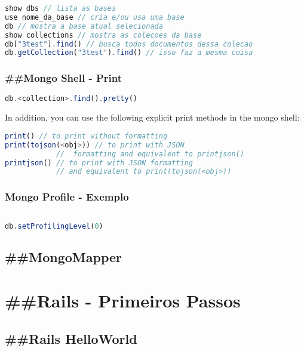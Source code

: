 \documentclass[serif,mathserif]{article}
\begin{document}
\begin{lstlisting}[language=Javascript]
show dbs // lista as bases
use nome_da_base // cria e/ou usa uma base
db // mostra a base atual selecionada
show collections // mostra as colecoes da base
db["3test"].find() // busca todos documentos dessa colecao
db.getCollection("3test").find() // isso faz a mesma coisa
\end{lstlisting}

\subsubsection{\#\#Mongo Shell - Print}
\begin{lstlisting}[language=Javascript]
db.<collection>.find().pretty()
\end{lstlisting}

In addition, you can use the following explicit print methods in the mongo shell:
\begin{lstlisting}[language=Javascript]
print() // to print without formatting
print(tojson(<obj>)) // to print with JSON 
            //  formatting and equivalent to printjson()
printjson() // to print with JSON formatting
            // and equivalent to print(tojson(<obj>))
\end{lstlisting}


\subsubsection{Mongo Profile - Exemplo}
\begin{lstlisting}[language=Javascript]

\end{lstlisting}


\begin{lstlisting}[language=Javascript]
db.setProfilingLevel(0)
\end{lstlisting}



\subsection{\#\#MongoMapper}



\section{\#\#Rails - Primeiros Passos}

\subsection{\#\#Rails HelloWorld}
\end{document}
